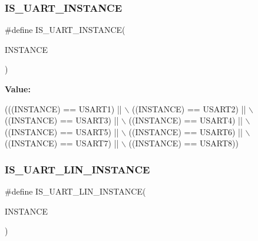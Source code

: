 \subsubsection{\texorpdfstring{I\+S\+\_\+\+U\+A\+R\+T\+\_\+\+I\+N\+S\+T\+A\+N\+CE}{IS\_UART\_INSTANCE}\hspace{0.1cm}{\footnotesize\ttfamily [13/13]}}
{\footnotesize\ttfamily \#define I\+S\+\_\+\+U\+A\+R\+T\+\_\+\+I\+N\+S\+T\+A\+N\+CE(\begin{DoxyParamCaption}\item[{}]{I\+N\+S\+T\+A\+N\+CE }\end{DoxyParamCaption})}

{\bfseries Value\+:}
\begin{DoxyCode}
(((INSTANCE) == USART1) || \(\backslash\)
                                      ((INSTANCE) == USART2) || \(\backslash\)
                                      ((INSTANCE) == USART3) || \(\backslash\)
                                      ((INSTANCE) == USART4) || \(\backslash\)
                                      ((INSTANCE) == USART5) || \(\backslash\)
                                      ((INSTANCE) == USART6) || \(\backslash\)
                                      ((INSTANCE) == USART7) || \(\backslash\)
                                      ((INSTANCE) == USART8))
\end{DoxyCode}
\mbox{\label{group___exported__macro_ga7d2763df993c77cfa6e249ec7bc80482}} 
\subsubsection{\texorpdfstring{I\+S\+\_\+\+U\+A\+R\+T\+\_\+\+L\+I\+N\+\_\+\+I\+N\+S\+T\+A\+N\+CE}{IS\_UART\_LIN\_INSTANCE}\hspace{0.1cm}{\footnotesize\ttfamily [1/5]}}
{\footnotesize\ttfamily \#define I\+S\+\_\+\+U\+A\+R\+T\+\_\+\+L\+I\+N\+\_\+\+I\+N\+S\+T\+A\+N\+CE(\begin{DoxyParamCaption}\item[{}]{I\+N\+S\+T\+A\+N\+CE }\end{DoxyParamCaption})}

